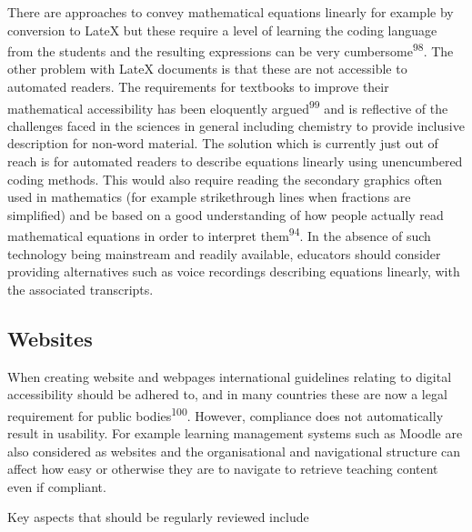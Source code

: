 \documentclass[11.5pt]{sig-alternate} %
\begin{document}
\begin{large}
There are approaches to convey mathematical equations linearly for example by conversion to LateX but these require a level of learning the coding language from the students and the resulting expressions can be very cumbersome\textsuperscript{98}. The other problem with LateX documents is that these are not accessible to automated readers. The requirements for textbooks to improve their mathematical accessibility has been eloquently argued\textsuperscript{99} and is reflective of the challenges faced in the sciences in general including chemistry to provide inclusive description for non-word material. The solution which is currently just out of reach is for automated readers to describe equations linearly using unencumbered coding methods. This would also require reading the secondary graphics often used in mathematics (for example strikethrough lines when fractions are simplified) and be based on a good understanding of how people actually read mathematical equations in order to interpret them\textsuperscript{94}. In the absence of such technology being mainstream and readily available, educators should consider providing alternatives such as voice recordings describing equations linearly, with the associated transcripts.

\subsection*{Websites}
When creating website and webpages international guidelines relating to digital accessibility should be adhered to, and in many countries these are now a legal requirement for public bodies\textsuperscript{100}. However, compliance does not automatically result in usability.  For example learning management systems such as Moodle are also considered as websites and the organisational and navigational structure can affect how easy or otherwise they are to navigate to retrieve teaching content even if compliant. 

Key aspects that should be regularly reviewed include


\end{large}
\end{document}
